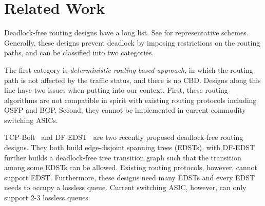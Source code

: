 \section{Related Work}\label{sec:related}




Deadlock-free routing designs have a long list. See
\cite{dally,duato93,dally93,sancho2004,flich2012survey,lash,wu2003fault,glass,duato2001,domke2011,puente1999,dfedst16}
for representative schemes. Generally, these designs prevent deadlock
by imposing restrictions on the routing paths, and can be classified
into two categories.

The first category is {\em deterministic routing based approach}, in
which the routing path is not affected by the traffic status, and there
is no CBD.
Designs along this line have two issues when putting into our context.
First, these routing algorithms are not compatible in spirit with
existing routing protocols including OSFP and BGP. Second, they cannot
be implemented in current commodity switching ASICs.

TCP-Bolt~\cite{tcpbolt} and DF-EDST~\cite{dfedst16} are two recently
proposed deadlock-free routing designs. They both build edge-disjoint
spanning trees (EDSTs), with DF-EDST~\cite{dfedst16} further builds a
deadlock-free tree transition graph such that the transition among some
EDSTs can be allowed. Existing routing protocols, however, cannot
support EDST. Furthermore, these designs need many EDSTs and every EDST
needs to occupy a lossless queue. Current switching ASIC, however, can
only support 2-3 lossless queues.

